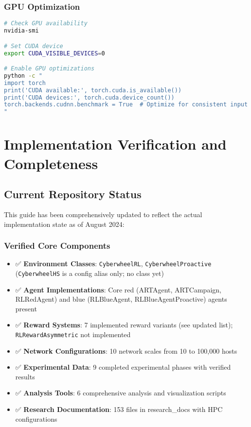 \documentclass[12pt,a4paper]{article}
\begin{document}
\subsubsection{GPU Optimization}
\begin{lstlisting}[language=bash, caption=GPU Performance Optimization]
# Check GPU availability
nvidia-smi

# Set CUDA device
export CUDA_VISIBLE_DEVICES=0

# Enable GPU optimizations
python -c "
import torch
print('CUDA available:', torch.cuda.is_available())
print('CUDA devices:', torch.cuda.device_count())
torch.backends.cudnn.benchmark = True  # Optimize for consistent input sizes
"
\end{lstlisting}

\section{Implementation Verification and Completeness}

\subsection{Current Repository Status}

This guide has been comprehensively updated to reflect the actual implementation state as of August 2024:

\subsubsection{Verified Core Components}
\begin{itemize}
    \item ✅ \textbf{Environment Classes}: \texttt{CyberwheelRL}, \texttt{CyberwheelProactive} (\texttt{CyberwheelHS} is a config alias only; no class yet)
    \item ✅ \textbf{Agent Implementations}: Core red (ARTAgent, ARTCampaign, RLRedAgent) and blue (RLBlueAgent, RLBlueAgentProactive) agents present
    \item ✅ \textbf{Reward Systems}: 7 implemented reward variants (see updated list); \texttt{RLRewardAsymmetric} not implemented
    \item ✅ \textbf{Network Configurations}: 10 network scales from 10 to 100,000 hosts
    \item ✅ \textbf{Experimental Data}: 9 completed experimental phases with verified results
    \item ✅ \textbf{Analysis Tools}: 6 comprehensive analysis and visualization scripts
    \item ✅ \textbf{Research Documentation}: 153 files in research\_docs with HPC configurations
\end{itemize}
\end{document}

